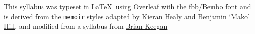 \documentclass[10pt]{memoir}
\def\datedate{\datedayname,\space\datemonthname~\thedateday}
\newcommand{\adddays}[1]{%
    \addtocounter{datenumber}{#1}%
    \setdatebynumber{\thedatenumber}%
}
\begin{document}
This syllabus was typeset in \LaTeX~using \href{http://www.sharelatex.com}{Overleaf} with the \href{http://www.tug.dk/FontCatalogue/fbb/}{fbb/Bembo} font and is derived from the \texttt{memoir} styles adapted by \href{https://github.com/kjhealy/latex-custom-kjh}{Kieran Healy} and \href{http://projects.mako.cc/source/?p=latex_mako;a=summary}{Benjamin `Mako' Hill}, and modified from a syllabus from \href{https://www.brianckeegan.com/}{Brian Keegan} 

\clearpage





\end{document}
